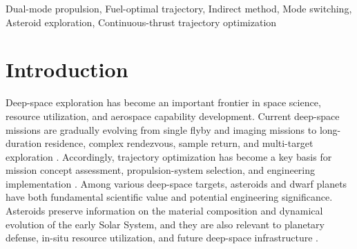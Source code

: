 ﻿\documentclass{IEEEtaes}
\begin{document}
\begin{abstract}This paper investigates fuel-optimal trajectory optimization and mode-switching behavior for asteroid exploration using a single-thruster dual-mode propulsion system. The thruster operates in two mutually exclusive modes: a low-thrust high-specific-impulse mode for propellant-efficient acceleration and a high-thrust low-specific-impulse mode for rapid local maneuvering. Within an indirect optimal-control framework in modified equinoctial elements, the optimal thrust direction, switching functions, Hamiltonian-based mode-selection rule, and shooting equations are used to solve the fixed-time fuel-optimal problem. An Earth-to-Ceres heliocentric rendezvous is analyzed as the numerical case. Four schemes, namely low-thrust-only, high-thrust-only, dual-mode with coasting, and dual-mode without coasting, are compared, and a thrust-ratio--specific-impulse-ratio plane is introduced to characterize the mass-gain boundary relative to the low-thrust baseline. Results show that the dual-mode coasting scheme yields fuel benefits only for suitable transfer times and propulsion-parameter combinations. The high-thrust mode is concentrated on short trajectory-reshaping arcs, whereas the low-thrust mode dominates long-duration propulsion. The boundary analysis indicates that the fuel advantage is governed jointly by thrust enhancement and specific-impulse loss, with the latter exerting a stronger influence.
\end{abstract}

\begin{IEEEkeywords}Dual-mode propulsion, Fuel-optimal trajectory, Indirect method, Mode switching, Asteroid exploration, Continuous-thrust trajectory optimization
\end{IEEEkeywords}


\section{Introduction}
Deep-space exploration has become an important frontier in space science, resource utilization, and aerospace capability development. Current deep-space missions are gradually evolving from single flyby and imaging missions to long-duration residence, complex rendezvous, sample return, and multi-target exploration \cite{racca2003}. Accordingly, trajectory optimization has become a key basis for mission concept assessment, propulsion-system selection, and engineering implementation \cite{vasile2006}. Among various deep-space targets, asteroids and dwarf planets have both fundamental scientific value and potential engineering significance. Asteroids preserve information on the material composition and dynamical evolution of the early Solar System, and they are also relevant to planetary defense, in-situ resource utilization, and future deep-space infrastructure \cite{azadmanesh2023}.
\end{document}
